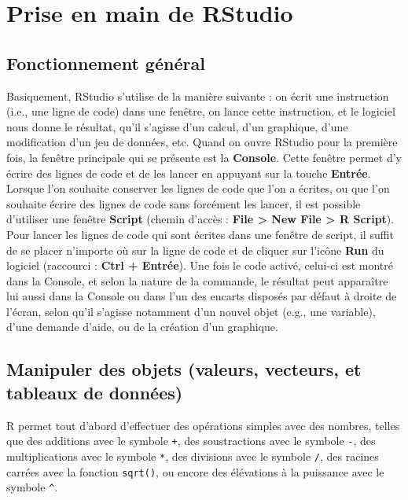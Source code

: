 \documentclass[
]{book}
\begin{document}
\hypertarget{prise-en-main-de-rstudio}{%
\section{Prise en main de RStudio}\label{prise-en-main-de-rstudio}}

\hypertarget{fonctionnement-guxe9nuxe9ral}{%
\subsection{Fonctionnement général}\label{fonctionnement-guxe9nuxe9ral}}

Basiquement, RStudio s'utilise de la manière suivante : on écrit une instruction (i.e., une ligne de code) dans une fenêtre, on lance cette instruction, et le logiciel nous donne le résultat, qu'il s'agisse d'un calcul, d'un graphique, d'une modification d'un jeu de données, etc. Quand on ouvre RStudio pour la première fois, la fenêtre principale qui se présente est la \textbf{Console}. Cette fenêtre permet d'y écrire des lignes de code et de les lancer en appuyant sur la touche \textbf{Entrée}. Lorsque l'on souhaite conserver les lignes de code que l'on a écrites, ou que l'on souhaite écrire des lignes de code sans forcément les lancer, il est possible d'utiliser une fenêtre \textbf{Script} (chemin d'accès : \textbf{File \textgreater{} New File \textgreater{} R Script}). Pour lancer les lignes de code qui sont écrites dans une fenêtre de script, il suffit de se placer n'importe où sur la ligne de code et de cliquer sur l'icône \textbf{Run} du logiciel (raccourci : \textbf{Ctrl + Entrée}). Une fois le code activé, celui-ci est montré dans la Console, et selon la nature de la commande, le résultat peut apparaître lui aussi dans la Console ou dans l'un des encarts disposés par défaut à droite de l'écran, selon qu'il s'agisse notamment d'un nouvel objet (e.g., une variable), d'une demande d'aide, ou de la création d'un graphique.

\hypertarget{manipuler-des-objets-valeurs-vecteurs-et-tableaux-de-donnuxe9es}{%
\subsection{Manipuler des objets (valeurs, vecteurs, et tableaux de données)}\label{manipuler-des-objets-valeurs-vecteurs-et-tableaux-de-donnuxe9es}}

R permet tout d'abord d'effectuer des opérations simples avec des nombres, telles que des additions avec le symbole \texttt{+}, des soustractions avec le symbole \texttt{-}, des multiplications avec le symbole \texttt{*}, des divisions avec le symbole \texttt{/}, des racines carrées avec la fonction \texttt{sqrt()}, ou encore des élévations à la puissance avec le symbole \texttt{\^{}}.
\end{document}
